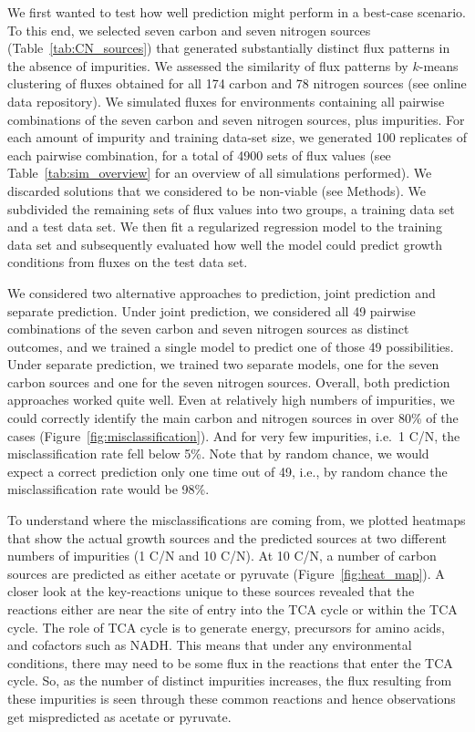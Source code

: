 \documentclass[12pt]{article}
\begin{document}
We first wanted to test how well prediction might perform in a best-case scenario. To this end, we selected seven carbon and seven nitrogen sources (Table~\ref{tab:CN_sources}) that generated substantially distinct flux patterns in the absence of impurities. We assessed the similarity of flux patterns by $k$-means clustering of fluxes obtained for all 174 carbon and 78 nitrogen sources (see online data repository). We simulated fluxes for environments containing all pairwise combinations of the seven carbon and seven nitrogen sources, plus impurities. For each amount of impurity and training data-set size, we generated 100 replicates of each pairwise combination, for a total of 4900 sets of flux values (see Table~\ref{tab:sim_overview} for an overview of all simulations performed). We discarded solutions that we considered to be non-viable (see Methods). We subdivided the remaining sets of flux values into two groups, a training data set and a test data set. We then fit a regularized regression model to the training data set and subsequently evaluated how well the model could predict growth conditions from fluxes on the test data set.

We considered two alternative approaches to prediction, joint prediction and separate prediction. Under joint prediction, we considered all 49 pairwise combinations of the seven carbon and seven nitrogen sources as distinct outcomes, and we trained a single model to predict one of those 49 possibilities. Under separate prediction, we trained two separate models, one for the seven carbon sources and one for the seven nitrogen sources. Overall, both prediction approaches worked quite well.  Even at relatively high numbers of impurities, we could correctly identify the main carbon and nitrogen sources in over 80\% of the cases (Figure~\ref{fig:misclassification}).  And for very few impurities, i.e.\ 1 C/N, the misclassification rate fell below 5\%. Note that by random chance, we would expect a correct prediction only one time out of 49, i.e., by random chance the misclassification rate would be 98\%.

To understand where the misclassifications are coming from, we plotted heatmaps that show the actual growth sources and the predicted sources at two different numbers of impurities (1 C/N and 10 C/N). At 10 C/N, a number of carbon sources are predicted as either acetate or pyruvate (Figure~\ref{fig:heat_map}). A closer look at the key-reactions unique to these sources revealed that the reactions either are near the site of entry into the TCA cycle or within the TCA cycle. The role of TCA cycle is to generate energy, precursors for amino acids, and cofactors such as NADH.  This means that under any environmental conditions, there may need to be some flux in the reactions that enter the TCA cycle. So, as the number of distinct impurities increases, the flux resulting from these impurities is seen through these common reactions and hence observations get mispredicted as acetate or pyruvate. 
\end{document}
